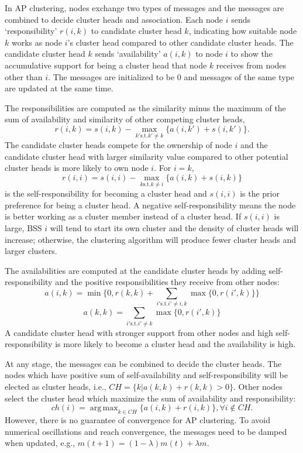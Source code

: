 \documentclass[10pt, conference, letterpaper]{IEEEtran}
\DeclareMathOperator*{\argmax}{arg\,max}
\begin{document}
In AP clustering, nodes exchange two types of messages and the messages are combined to decide cluster heads and association. Each node $i$ sends `responsibility' $r(i,k)$ to candidate cluster head $k$, indicating how suitable node $k$ works as node $i$'s cluster head compared to other candidate cluster heads. The candidate cluster head $k$ sends `availability' $a(i,k)$ to node $i$ to show the accumulative support for being a cluster head that node $k$ receives from nodes other than $i$. The messages are initialized to be 0 and messages of the same type are updated at the same time. 

The responsibilities are computed as the similarity minus the maximum of the sum of availability and similarity of other competing cluster heads,
\begin{equation}\label{eq:r_update}
r(i,k) = s(i,k) - \max_{k'\text{s.t.}k'\neq k}\{a(i,k') + s(i,k')\}.
\end{equation}
The candidate cluster heads compete for the ownership of node $i$ and the candidate cluster head with larger similarity value compared to other potential cluster heads is more likely to own node $i$. For $i = k$, 
$$r(i,i) = s(i,i) - \max_{k\text{s.t.}k\neq i}\{a(i,k) + s(i,k)\}$$ is the self-responsibility for becoming a cluster head and $s(i,i)$ is the prior preference for being a cluster head. A negative self-responsibility means the node is better working as a cluster member instead of a cluster head. If $s(i,i)$ is large, BSS $i$ will tend to start its own cluster and the density of cluster heads will increase; otherwise, the clustering algorithm will produce fewer cluster heads and larger clusters.

The availabilities are computed at the candidate cluster heads by adding self-responsibility and the positive responsibilities they receive from other nodes: 
\begin{equation}\label{eq:a_update1}
a(i,k) = \min \Big\{0, r(k,k) + \sum_{i'\text{s.t.}i'\neq i,k}\max \{0, r(i',k) \}\Big\}
\end{equation}
\begin{equation}\label{eq:a_update2}
a(k,k) =\sum_{i'\text{s.t.}i'\neq k}\max \{0, r(i',k) \}
\end{equation}
A candidate cluster head with stronger support from other nodes and high self-responsibility is more likely to become a cluster head and the availability is high. 

At any stage, the messages can be combined to decide the cluster heads. The nodes which have positive sum of self-availability and self-responsibility will be elected as cluster heads, i.e., 
$CH = \{k|a(k,k) + r(k,k)>0\}$. Other nodes select the cluster head which maximize the sum of availability and responsibility:
$$ch(i) = \argmax_{k\in CH}\{a(i,k)+r(i,k)\}, \forall i\notin CH.$$
However, there is no guarantee of convergence for AP clustering. To avoid numerical oscillations and reach convergence, the messages need to be damped when updated, e.g., $m(t+1) = (1-\lambda)m(t) + \lambda m$. 
\end{document}
